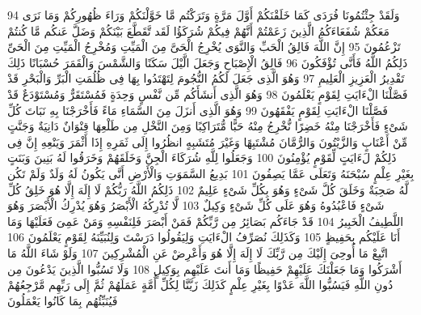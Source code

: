 {\tiny\colorbox{cl_aya}{94}} وَلَقَدْ جِئْتُمُونَا فُرَدَى كَمَا خَلَقْنَكُمْ أَوَّلَ مَرَّةٍ وَتَرَكْتُم مَّا خَوَّلْنَكُمْ وَرَاءَ ظُهُورِكُمْ وَمَا نَرَى مَعَكُمْ شُفَعَاءَكُمُ الَّذِينَ زَعَمْتُمْ أَنَّهُمْ فِيكُمْ شُرَكَؤُا لَقَد تَّقَطَّعَ بَيْنَكُمْ وَضَلَّ عَنكُم مَّا كُنتُمْ تَزْعُمُونَ
{\tiny\colorbox{cl_aya}{95}} إِنَّ اللَّهَ فَالِقُ الْحَبِّ وَالنَّوَى يُخْرِجُ الْحَىَّ مِنَ الْمَيِّتِ وَمُخْرِجُ الْمَيِّتِ مِنَ الْحَىِّ ذَلِكُمُ اللَّهُ فَأَنَّى تُؤْفَكُونَ
{\tiny\colorbox{cl_aya}{96}} فَالِقُ الْإِصْبَاحِ وَجَعَلَ الَّيْلَ سَكَنًا وَالشَّمْسَ وَالْقَمَرَ حُسْبَانًا ذَلِكَ تَقْدِيرُ الْعَزِيزِ الْعَلِيمِ
{\tiny\colorbox{cl_aya}{97}} وَهُوَ الَّذِى جَعَلَ لَكُمُ النُّجُومَ لِتَهْتَدُوا بِهَا فِى ظُلُمَتِ الْبَرِّ وَالْبَحْرِ قَدْ فَصَّلْنَا الْءَايَتِ لِقَوْمٍ يَعْلَمُونَ
{\tiny\colorbox{cl_aya}{98}} وَهُوَ الَّذِى أَنشَأَكُم مِّن نَّفْسٍ وَحِدَةٍ فَمُسْتَقَرٌّ وَمُسْتَوْدَعٌ قَدْ فَصَّلْنَا الْءَايَتِ لِقَوْمٍ يَفْقَهُونَ
{\tiny\colorbox{cl_aya}{99}} وَهُوَ الَّذِى أَنزَلَ مِنَ السَّمَاءِ مَاءً فَأَخْرَجْنَا بِهِ نَبَاتَ كُلِّ شَىْءٍ فَأَخْرَجْنَا مِنْهُ خَضِرًا نُّخْرِجُ مِنْهُ حَبًّا مُّتَرَاكِبًا وَمِنَ النَّخْلِ مِن طَلْعِهَا قِنْوَانٌ دَانِيَةٌ وَجَنَّتٍ مِّنْ أَعْنَابٍ وَالزَّيْتُونَ وَالرُّمَّانَ مُشْتَبِهًا وَغَيْرَ مُتَشَبِهٍ انظُرُوا إِلَى ثَمَرِهِ إِذَا أَثْمَرَ وَيَنْعِهِ إِنَّ فِى ذَلِكُمْ لَءَايَتٍ لِّقَوْمٍ يُؤْمِنُونَ
{\tiny\colorbox{cl_aya}{100}} وَجَعَلُوا لِلَّهِ شُرَكَاءَ الْجِنَّ وَخَلَقَهُمْ وَخَرَقُوا لَهُ بَنِينَ وَبَنَتٍ بِغَيْرِ عِلْمٍ سُبْحَنَهُ وَتَعَلَى عَمَّا يَصِفُونَ
{\tiny\colorbox{cl_aya}{101}} بَدِيعُ السَّمَوَتِ وَالْأَرْضِ أَنَّى يَكُونُ لَهُ وَلَدٌ وَلَمْ تَكُن لَّهُ صَحِبَةٌ وَخَلَقَ كُلَّ شَىْءٍ وَهُوَ بِكُلِّ شَىْءٍ عَلِيمٌ
{\tiny\colorbox{cl_aya}{102}} ذَلِكُمُ اللَّهُ رَبُّكُمْ لَا إِلَهَ إِلَّا هُوَ خَلِقُ كُلِّ شَىْءٍ فَاعْبُدُوهُ وَهُوَ عَلَى كُلِّ شَىْءٍ وَكِيلٌ
{\tiny\colorbox{cl_aya}{103}} لَّا تُدْرِكُهُ الْأَبْصَرُ وَهُوَ يُدْرِكُ الْأَبْصَرَ وَهُوَ اللَّطِيفُ الْخَبِيرُ
{\tiny\colorbox{cl_aya}{104}} قَدْ جَاءَكُم بَصَائِرُ مِن رَّبِّكُمْ فَمَنْ أَبْصَرَ فَلِنَفْسِهِ وَمَنْ عَمِىَ فَعَلَيْهَا وَمَا أَنَا عَلَيْكُم بِحَفِيظٍ
{\tiny\colorbox{cl_aya}{105}} وَكَذَلِكَ نُصَرِّفُ الْءَايَتِ وَلِيَقُولُوا دَرَسْتَ وَلِنُبَيِّنَهُ لِقَوْمٍ يَعْلَمُونَ
{\tiny\colorbox{cl_aya}{106}} اتَّبِعْ مَا أُوحِىَ إِلَيْكَ مِن رَّبِّكَ لَا إِلَهَ إِلَّا هُوَ وَأَعْرِضْ عَنِ الْمُشْرِكِينَ
{\tiny\colorbox{cl_aya}{107}} وَلَوْ شَاءَ اللَّهُ مَا أَشْرَكُوا وَمَا جَعَلْنَكَ عَلَيْهِمْ حَفِيظًا وَمَا أَنتَ عَلَيْهِم بِوَكِيلٍ
{\tiny\colorbox{cl_aya}{108}} وَلَا تَسُبُّوا الَّذِينَ يَدْعُونَ مِن دُونِ اللَّهِ فَيَسُبُّوا اللَّهَ عَدْوًا بِغَيْرِ عِلْمٍ كَذَلِكَ زَيَّنَّا لِكُلِّ أُمَّةٍ عَمَلَهُمْ ثُمَّ إِلَى رَبِّهِم مَّرْجِعُهُمْ فَيُنَبِّئُهُم بِمَا كَانُوا يَعْمَلُونَ

